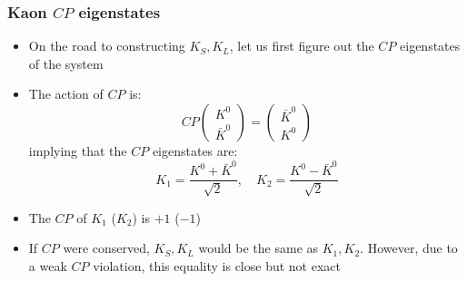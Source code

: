 \documentclass[11pt]{article}
\newcommand{\CP}{\ensuremath{CP}\xspace}
\begin{document}
  \subsubsection{Kaon \CP eigenstates}
  \begin{itemize}
    \item On the road to constructing $K_S,K_L$, let us first figure out the \CP eigenstates of the system
    \item The action of \CP is:
    \begin{equation}
      \CP \begin{pmatrix} K^0 \\ \bar K^0 \end{pmatrix} = \begin{pmatrix} \bar K^0 \\ K^0 \end{pmatrix}
    \end{equation}
    implying that the \CP eigenstates are:
    \begin{equation}
      K_1 = \frac{K^0 + \bar K^0}{\sqrt2},\quad K_2 = \frac{K^0 - \bar K^0}{\sqrt2}
    \end{equation}
    \item The \CP of $K_1$ ($K_2$) is $+1$ ($-1$)
    \item If \CP were conserved, $K_S,K_L$ would be the same as $K_1,K_2$. However, due to a weak \CP violation, this equality is close but not exact
  \end{itemize}
\end{document}

